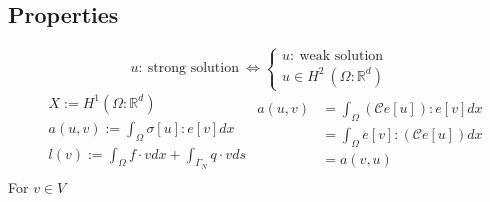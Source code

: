 \documentclass[a4paper,12pt]{article}
\newcommand{\R}{\mathbb{R}}
\newcommand{\Cmod}{\mathcal{C}}
\begin{document}
\subsection{Properties}
\begin{equation*}
u:\ \text{strong solution}\ \Leftrightarrow \begin{cases}
u:\ \text{weak solution}\\
u\in H^2\ (\Omega : \R^d)
\end{cases}
\end{equation*}
\begin{equation*}
\begin{aligned}
&X:= H^1(\Omega : \R^d)\\
&a(u,v) := \int_\Omega \sigma[u] : e[v] dx\\
&l(v) := \int_\Omega f\cdot v dx + \int_{\Gamma_N} q \cdot v ds\\
\end{aligned}
\begin{aligned}
a(u,v) &= \int_\Omega (\Cmod e[u]) : e[v] dx\\
&= \int_\Omega e[v] : (\Cmod e[u]) dx\\
&= a(v,u)
\end{aligned}
\end{equation*}
For $v \in V$
\begin{equation*}

\end{equation*}
\end{document}
